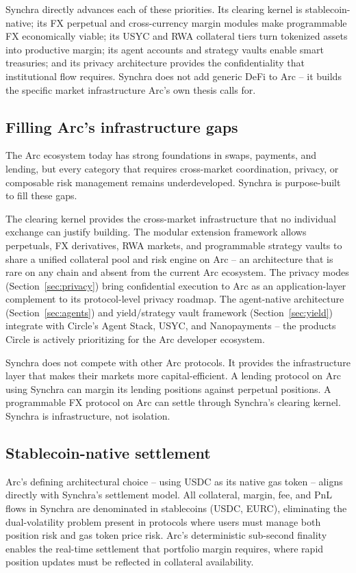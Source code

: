 \documentclass[11pt,a4paper]{article}
\begin{document}
Synchra directly advances each of these priorities. Its clearing kernel is stablecoin-native; its FX perpetual and cross-currency margin modules make programmable FX economically viable; its USYC and RWA collateral tiers turn tokenized assets into productive margin; its agent accounts and strategy vaults enable smart treasuries; and its privacy architecture provides the confidentiality that institutional flow requires. Synchra does not add generic DeFi to Arc -- it builds the specific market infrastructure Arc's own thesis calls for.

\subsection{Filling Arc's infrastructure gaps}

The Arc ecosystem today has strong foundations in swaps, payments, and lending, but every category that requires cross-market coordination, privacy, or composable risk management remains underdeveloped. Synchra is purpose-built to fill these gaps.

The clearing kernel provides the cross-market infrastructure that no individual exchange can justify building. The modular extension framework allows perpetuals, FX derivatives, RWA markets, and programmable strategy vaults to share a unified collateral pool and risk engine on Arc -- an architecture that is rare on any chain and absent from the current Arc ecosystem. The privacy modes (Section~\ref{sec:privacy}) bring confidential execution to Arc as an application-layer complement to its protocol-level privacy roadmap. The agent-native architecture (Section~\ref{sec:agents}) and yield/strategy vault framework (Section~\ref{sec:yield}) integrate with Circle's Agent Stack, USYC, and Nanopayments -- the products Circle is actively prioritizing for the Arc developer ecosystem.

Synchra does not compete with other Arc protocols. It provides the infrastructure layer that makes their markets more capital-efficient. A lending protocol on Arc using Synchra can margin its lending positions against perpetual positions. A programmable FX protocol on Arc can settle through Synchra's clearing kernel. Synchra is infrastructure, not isolation.

\subsection{Stablecoin-native settlement}

Arc's defining architectural choice -- using USDC as its native gas token -- aligns directly with Synchra's settlement model. All collateral, margin, fee, and PnL flows in Synchra are denominated in stablecoins (USDC, EURC), eliminating the dual-volatility problem present in protocols where users must manage both position risk and gas token price risk. Arc's deterministic sub-second finality enables the real-time settlement that portfolio margin requires, where rapid position updates must be reflected in collateral availability.
\end{document}
